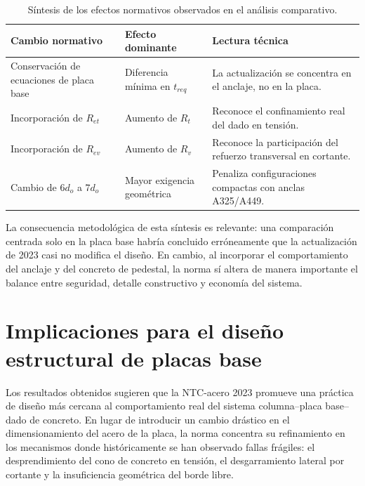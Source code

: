 \begin{table}[H]
  \centering
  \caption{Síntesis de los efectos normativos observados en el análisis comparativo.}
  \label{tab:sintesis_efectos_cap4}
  \begin{tabular}{p{}p{}p{}}
    \toprule
    Cambio normativo & Efecto dominante & Lectura técnica \\
    \midrule
    Conservación de ecuaciones de placa base & Diferencia mínima en $t_{req}$ & La actualización se concentra en el anclaje, no en la placa. \\
    Incorporación de $R_{et}$ & Aumento de $R_t$ & Reconoce el confinamiento real del dado en tensión. \\
    Incorporación de $R_{ev}$ & Aumento de $R_v$ & Reconoce la participación del refuerzo transversal en cortante. \\
    Cambio de $6d_o$ a $7d_o$ & Mayor exigencia geométrica & Penaliza configuraciones compactas con anclas A325/A449. \\
    \bottomrule
  \end{tabular}
\end{table}

La consecuencia metodológica de esta síntesis es relevante: una comparación centrada solo en la
placa base habría concluido erróneamente que la actualización de 2023 casi no modifica el diseño.
En cambio, al incorporar el comportamiento del anclaje y del concreto de pedestal, la norma sí altera
de manera importante el balance entre seguridad, detalle constructivo y economía del sistema.

\section{Implicaciones para el diseño estructural de placas base}

Los resultados obtenidos sugieren que la NTC-acero 2023 promueve una práctica de diseño más cercana
al comportamiento real del sistema columna--placa base--dado de concreto. En lugar de introducir un
cambio drástico en el dimensionamiento del acero de la placa, la norma concentra su refinamiento en
los mecanismos donde históricamente se han observado fallas frágiles: el desprendimiento del cono de
concreto en tensión, el desgarramiento lateral por cortante y la insuficiencia geométrica del borde
libre.

